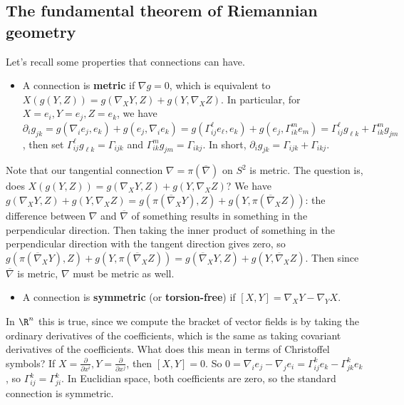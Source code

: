 \subsection{The fundamental theorem of Riemannian geometry}
Let's recall some properties that connections can have.
\begin{itemize}
    \item A connection is \textbf{metric} if $\nabla g=0$, which is equivalent to $X(g(Y,Z))=g(\nabla_XY,Z)+g(Y,\nabla_XZ)$. In particular, for $X=e_i ,Y=e_j ,Z=e_k$, we have $\partial _i g_{jk}=g(\nabla _i e_j ,e_k)+g(e_j ,\nabla _i e_k)=g(\Gamma _{ij}^{\ell}e_{\ell},e_k)+g(e_j ,\Gamma _{ik}^me_m)=\Gamma _{ij}^{\ell}g_{\ell k}+\Gamma _{ik}^m g_{jm}$, then set $\Gamma _{ij}^{\ell} g_{\ell k}=\Gamma _{ijk}$ and $\Gamma _{ik}^mg_{jm}=\Gamma _{ikj}$. In short, $\boxed{ \partial _i g_{jk}=\Gamma _{ijk}+\Gamma _{ikj}.}$ 
\end{itemize}
Note that our tangential connection $\nabla=\pi(\overline{\nabla})$ on $S^2$ is metric. The question is, does $X(g(Y,Z))=g(\nabla_XY,Z)+g(Y,\nabla_XZ)$? We have $g(\nabla_XY,Z)+g(Y,\nabla_XZ)= g(\pi(\overline{\nabla}_XY),Z)+g(Y,\pi(\overline{\nabla}_XZ))$: the difference between $\nabla$ and $\overline{\nabla}$ of something results in something in the perpendicular direction. Then taking the inner product of something in the perpendicular direction with the tangent direction gives zero, so $g(\pi(\overline{\nabla}_XY),Z)+g(Y,\pi(\overline{\nabla}_XZ))=g(\overline{\nabla}_XY,Z)+g(Y,\overline{\nabla}_XZ).$ Then since $\overline{\nabla}$ is metric, $\nabla$ must be metric as well.
\begin{itemize}
    \item A connection is \textbf{symmetric} (or \textbf{torsion-free}) if $[X,Y]=\nabla_XY-\nabla_YX$.
\end{itemize}
In $\R^n $ this is true, since we compute the bracket of vector fields is by taking the ordinary derivatives of the coefficients, which is the same as taking covariant derivatives of the coefficients. What does this mean in terms of Christoffel symbols? If $X= \frac{\partial}{\partial x^i },Y=\frac{\partial }{\partial x^j }$, then $[X,Y]=0$. So  $0=\nabla _i e_j -\nabla _j e_i =\Gamma _{ij}^k e_k-\Gamma _{jk}^ke_k$, so $\Gamma _{ij}^k=\Gamma _{ji}^k$. In Euclidian space, both coefficients are zero, so the standard connection is symmetric.

